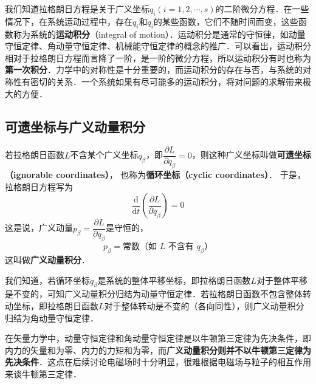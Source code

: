 

我们知道拉格朗日方程是关于广义坐标$q_i(i=1,2,\cdots,s)$的二阶微分方程．在一些情况下，在系统运动过程中，存在$q_i$和$\dot{q}_i$的某些函数，它们不随时间而变，这些函数称为系统的\textbf{运动积分}（integral of motion）．运动积分是通常的守恒律，如动量守恒定律、角动量守恒定律、机械能守恒定律的概念的推广．可以看出，运动积分相对于拉格朗日方程而言降了一阶，是一阶的微分方程，所以运动积分有时也称为\textbf{第一次积分}．力学中的对称性是十分重要的，而运动积分的存在与否，与系统的对称性有密切的关系．一个系统如果有尽可能多的运动积分，将对问题的求解带来极大的方便．

\subsection{可遗坐标与广义动量积分}

若拉格朗日函数$L$不含某个广义坐标$q_\beta$，即$\dfrac{\partial L}{\partial q_\beta}=0$，则这种广义坐标叫做\textbf{可遗坐标（ignorable coordinates）}， 也称为\textbf{循环坐标（cyclic coordinates）}． 于是， 拉格朗日方程写为
\begin{equation}
\frac{\mathrm{d}}{\mathrm{d} t}\left(\frac{\partial L}{\partial \dot{q}_{\beta}}\right)=0
\end{equation}
这是说，广义动量$p_\beta=\dfrac{\partial L} {\partial \dot{q_\beta}}$是守恒的，
\begin{equation}
p_\beta= \text{常数（如 $L$ 不含有 $q_\beta$）}
\end{equation}
这叫做\textbf{广义动量积分}．

我们知道，若循环坐标$q_\beta$是系统的整体平移坐标，即拉格朗日函数$L $对于整体平移是不变的，可知广义动量积分归结为动量守恒定律．若拉格朗日函数不包含整体转动坐标，即拉格朗日函数$L$对于整体转动是不变的（各向同性），则广义动量积分归结为角动量守恒定律．

在矢量力学中，动量守恒定律和角动量守恒定律是以牛顿第三定律为先决条件，即内力的矢量和为零、内力的力矩和为零，而\textbf{广义动量积分则并不以牛顿第三定律为先决条件}．这点在后续讨论电磁场时十分明显，很难根据电磁场与粒子的相互作用来谈牛顿第三定律．

